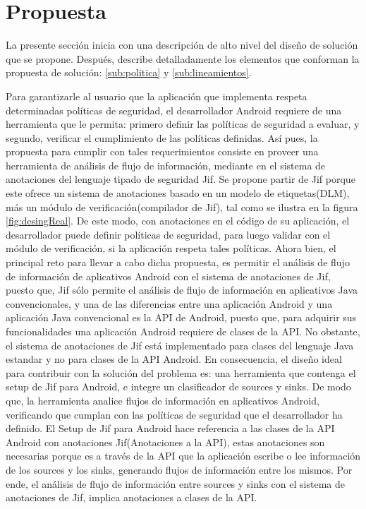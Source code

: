 \section{Propuesta}
\label{sec:propuesta}
La presente sección inicia con una descripción de alto nivel del diseño de
solución que se propone. Después, describe detalladamente los elementos que
conforman la propuesta de solución: \ref{sub:politica} y
\ref{sub:lineamientos}.\newline

Para garantizarle al usuario que la aplicación que implementa respeta
determinadas políticas de seguridad, el desarrollador Android requiere de una
herramienta que le permita: primero definir las políticas de seguridad a
evaluar, y segundo, verificar el cumplimiento de las políticas
definidas.\newline 
Así pues, la propuesta para cumplir con tales requerimientos consiste en proveer
una herramienta de análisis de flujo de información, mediante en el sistema de
anotaciones del lenguaje tipado de seguridad Jif. Se propone partir de Jif
porque este ofrece un sistema de anotaciones basado en un modelo de
etiquetas(DLM), más un módulo de verificación(compilador de Jif),
tal como se ilustra en la figura \ref{fig:desingReal}.
De este modo, con anotaciones en el código de su aplicación, el desarrollador
puede definir políticas de seguridad, para luego validar con el módulo de
verificación, si la aplicación respeta tales políticas.\newline 
Ahora bien, el principal reto para llevar a cabo dicha propuesta, es permitir el
análisis de flujo de información de aplicativos Android con el sistema de
anotaciones de Jif, puesto que, Jif sólo permite el análisis de flujo de
información en aplicativos Java convencionales, y una de las diferencias entre
una aplicación Android y una aplicación Java convencional es la API de Android,
puesto que, para adquirir sus funcionalidades una aplicación Android requiere de
clases de la API. No obstante, el sistema de anotaciones de Jif está
implementado para clases del lenguaje Java estandar y no para clases de la API
Android.\newline 
En consecuencia, el diseño ideal para contribuir con la solución del problema es:
una herramienta que contenga el setup de Jif para Android, e integre un clasificador de sources
y sinks. De modo que, la herramienta analice flujos de información en
aplicativos Android, verificando que cumplan con las políticas de seguridad que
el desarrollador ha definido.\newline 
El Setup de Jif para Android hace referencia a las clases de la API Android con
anotaciones Jif(Anotaciones a la API), estas anotaciones son necesarias porque
es a través de la API que la aplicación escribe o lee información de los sources
y los sinks, generando flujos de información entre los mismos. Por ende, el
análisis de flujo de información entre sources y sinks con el sistema de
anotaciones de Jif, implica anotaciones a clases de la API. 

